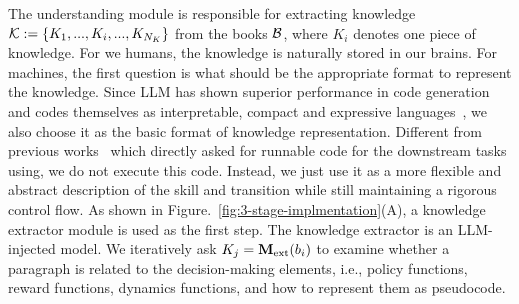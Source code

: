 
The understanding module is responsible for extracting knowledge $\mathcal{K}:=\{K_1, ..., K_i, ..., K_{N_{K}}\}$ from the books $\mathcal{B}$, where $K_i$ denotes one piece of knowledge. For we humans, the knowledge is naturally stored in our brains. For machines, the first question is what should be the appropriate format to represent the knowledge. Since LLM has shown superior performance in code generation and codes themselves as interpretable, compact and expressive languages~\citep{llm-code2024ke}, we also choose it as the basic format of knowledge representation. Different from previous works~\citep{voyager2023guanzhi} which directly asked for runnable code for the downstream tasks using, we do not execute this code. Instead, we just use it as a more flexible and abstract description of the skill and transition while still maintaining a rigorous control flow.  As shown in Figure.~\ref{fig:3-stage-implmentation}(A), a knowledge extractor module is used as the first step. The knowledge extractor is an LLM-injected model. We iteratively ask $K_j=\mathbf{M}_{\rm ext}(b_i)$ to examine whether a paragraph is related to the decision-making elements, i.e., policy functions, reward functions, dynamics functions, and how to represent them as pseudocode. 


